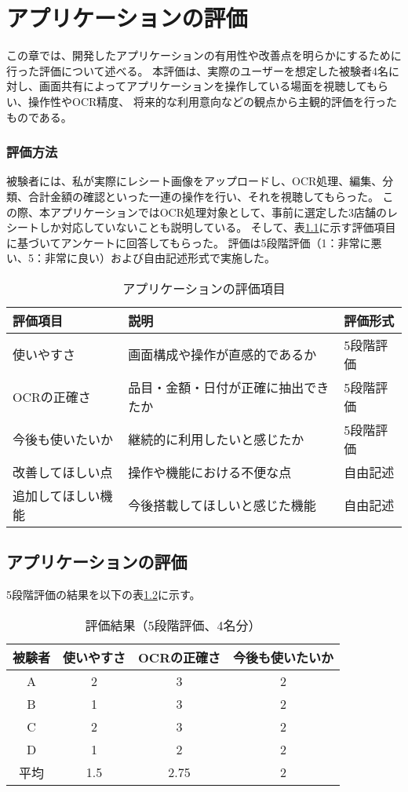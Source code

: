 \documentclass[main]{subfiles}
\begin{document}
\chapter{アプリケーションの評価}
\label{cha:evaluation}
この章では、開発したアプリケーションの有用性や改善点を明らかにするために行った評価について述べる。
本評価は、実際のユーザーを想定した被験者4名に対し、画面共有によってアプリケーションを操作している場面を視聴してもらい、操作性やOCR精度、
将来的な利用意向などの観点から主観的評価を行ったものである。

\subsection{評価方法}
被験者には、私が実際にレシート画像をアップロードし、OCR処理、編集、分類、合計金額の確認といった一連の操作を行い、それを視聴してもらった。
この際、本アプリケーションではOCR処理対象として、事前に選定した3店舗のレシートしか対応していないことも説明している。
そして、表\ref{tab:evaluation_criteria}に示す評価項目に基づいてアンケートに回答してもらった。
評価は5段階評価（1：非常に悪い、5：非常に良い）および自由記述形式で実施した。

\begin{table}[htbp]
\centering
\caption{アプリケーションの評価項目}
\label{tab:evaluation_criteria}
\begin{tabular}{lll}
\hline
評価項目 & 説明 & 評価形式 \\
\hline
使いやすさ & 画面構成や操作が直感的であるか & 5段階評価 \\
OCRの正確さ & 品目・金額・日付が正確に抽出できたか & 5段階評価 \\
今後も使いたいか & 継続的に利用したいと感じたか & 5段階評価 \\
改善してほしい点 & 操作や機能における不便な点 & 自由記述 \\
追加してほしい機能 & 今後搭載してほしいと感じた機能 & 自由記述 \\
\hline
\end{tabular}
\end{table}

\section{アプリケーションの評価}
5段階評価の結果を以下の表\ref{tab:evaluation_results}に示す。

\begin{table}[htbp]
\centering
\caption{評価結果（5段階評価、4名分）}
\label{tab:evaluation_results}
\begin{tabular}{cccc}
\hline
被験者 & 使いやすさ & OCRの正確さ & 今後も使いたいか \\
\hline
A & 2 & 3 & 2 \\
B & 1 & 3 & 2 \\
C & 2 & 3 & 2 \\
D & 1 & 2 & 2 \\
\hline
平均 & 1.5 & 2.75 & 2 \\
\hline
\end{tabular}
\end{table}
\end{document}
